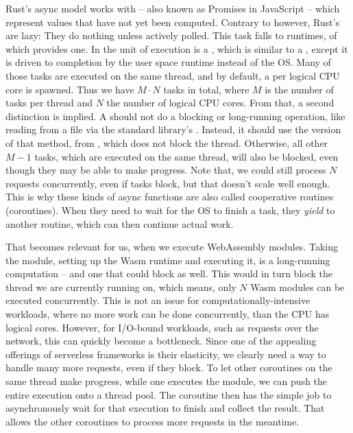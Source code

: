 Rust's async model works with  -- also known as Promises in JavaScript -- which represent values that have not yet been computed. Contrary to  however, Rust's  are lazy: They do nothing unless actively polled. This task falls to  runtimes, of which  provides one. In  the unit of execution is a , which is similar to a , except it is driven to completion by the user space runtime instead of the OS. Many of those tasks are executed on the same thread, and by default, a  per logical CPU core is spawned. Thus we have $M \cdot N$ tasks in total, where $M$ is the number of tasks per thread and $N$ the number of logical CPU cores.
From that, a second distinction is implied. A  should not do a blocking or long-running operation, like reading from a file via the standard library's . Instead, it should use the  version of that method, from , which does not block the thread. Otherwise, all other $M - 1$ tasks, which are executed on the same thread, will also be blocked, even though they may be able to make progress. Note that, we could still process $N$ requests concurrently, even if tasks block, but that doesn't scale well enough. This is why these kinds of async functions are also called cooperative routines (coroutines). When they need to wait for the OS to finish a task, they \emph{yield} to another routine, which can then continue actual work.

That becomes relevant for us, when we execute WebAssembly modules. Taking the module, setting up the Wasm runtime and executing it, is a long-running computation -- and one that could block as well. This would in turn block the thread we are currently running on, which means, only $N$ Wasm modules can be executed concurrently. This is not an issue for computationally-intensive workloads, where no more work can be done concurrently, than the CPU has logical cores. However, for I/O-bound workloads, such as requests over the network, this can quickly become a bottleneck. Since one of the appealing offerings of serverless frameworks is their elasticity, we clearly need a way to handle many more requests, even if they block.
To let other coroutines on the same thread make progress, while one executes the module, we can push the entire execution onto a thread pool. The coroutine then has the simple job to asynchronously wait for that execution to finish and collect the result. That allows the other coroutines to process more requests in the meantime.

